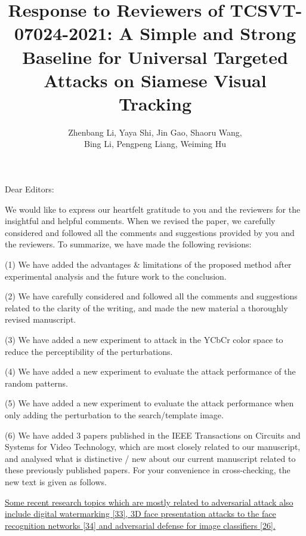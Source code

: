 \documentclass[12pt]{article}
\begin{document}
\linespread{1}
\title{Response to Reviewers of TCSVT-07024-2021: A Simple and Strong Baseline for Universal Targeted Attacks on Siamese Visual Tracking}
\author{Zhenbang Li, Yaya Shi, Jin Gao, Shaoru Wang, \\Bing Li, Pengpeng Liang, Weiming Hu}
\date{}
\maketitle

\noindent Dear Editors:

We would like to express our heartfelt gratitude to you and the reviewers for the insightful and helpful comments. When we revised the paper, we carefully considered and followed all the comments and suggestions provided by you and the reviewers. To summarize, we have made the following revisions:

(1) We have added the advantages \& limitations of the proposed method after experimental analysis and the future work to the conclusion.

(2) We have carefully considered and followed all the comments and suggestions related to the clarity of the writing, and made the new material a thoroughly revised manuscript.

(3) We have added a new experiment to attack in the YCbCr color space to reduce the perceptibility of the perturbations.

(4) We have added a new experiment to evaluate the attack performance of the random patterns.

(5) We have added a new experiment to evaluate the attack performance when only adding the perturbation to the search/template image.

(6) We have added 3 papers published in the IEEE Transactions on Circuits and Systems for Video Technology, which are most closely related to our manuscript, and analysed what is distinctive / new about our current manuscript related to these previously published papers. For your convenience in cross-checking, the new text is given as follows.

\uline{
Some recent research topics which are mostly related to adversarial attack also include digital watermarking [33], 3D face presentation attacks to the face recognition networks [34] and adversarial defense for image classifiers [26].
}
\end{document}
